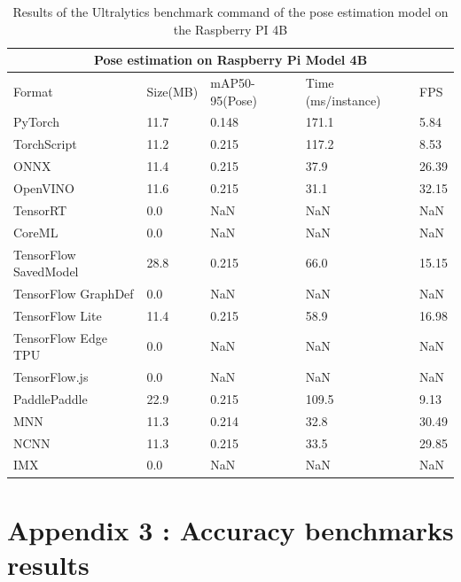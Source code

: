 \documentclass[12pt]{article}
\begin{document}
\begin{table}[H]
  \centering
  \begin{tabular}{ |p{3cm}|p{2cm}|p{2cm}|p{3cm}|p{2cm}|  }
    \hline
    \multicolumn{5}{|c|}{Pose estimation on Raspberry Pi Model 4B} \\
    \hline
    Format& Size(MB) &mAP50-95(Pose) &Time (ms/instance) &FPS\\
    \hline
    PyTorch&11.7&0.148&171.1&5.84 \\
    TorchScript&11.2&0.215&117.2&8.53 \\
    ONNX&11.4&0.215&37.9&26.39 \\
    OpenVINO&11.6&0.215&31.1&32.15 \\
    TensorRT&0.0&NaN&NaN&NaN \\
    CoreML&0.0&NaN&NaN&NaN \\
    TensorFlow SavedModel&28.8&0.215&66.0&15.15 \\
    TensorFlow GraphDef&0.0&NaN&NaN&NaN \\
    TensorFlow Lite&11.4&0.215&58.9&16.98 \\
    TensorFlow Edge TPU&0.0&NaN&NaN&NaN \\
    TensorFlow.js&0.0&NaN&NaN&NaN \\
    PaddlePaddle&22.9&0.215&109.5&9.13 \\
    MNN&11.3&0.214&32.8&30.49 \\
    NCNN&11.3&0.215&33.5&29.85 \\
    IMX&0.0&NaN&NaN&NaN \\
    \hline
  \end{tabular}
  \caption{Results of the Ultralytics benchmark command of the pose estimation model on the Raspberry PI 4B}
  \label{table:perpi}
\end{table}

\clearpage

\section{Appendix 3 : Accuracy benchmarks results}
\label{sec:accuracy}
\end{document}

